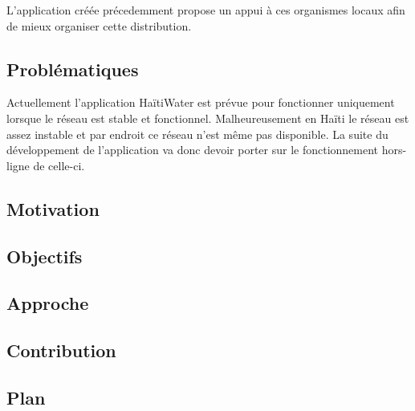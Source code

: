 \documentclass{EPL-master-thesis-covers-FR}
\begin{document}
			L'application créée précedemment propose un appui à ces organismes locaux afin de mieux organiser cette distribution. 

			

		\subsection*{Problématiques}
		
			Actuellement l'application HaïtiWater est prévue pour fonctionner uniquement lorsque le réseau est stable et fonctionnel. Malheureusement en Haïti le réseau est assez instable et par endroit ce réseau n'est même pas disponible. La suite du développement de l'application va donc devoir porter sur le fonctionnement hors-ligne de celle-ci. 


		\subsection*{Motivation}

			

		\subsection*{Objectifs}

			
		\subsection*{Approche}

			
		\subsection*{Contribution}


		\subsection*{Plan}
\end{document}
